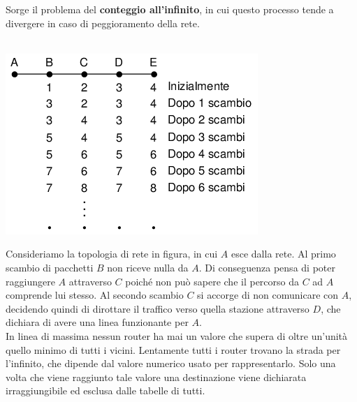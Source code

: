 \documentclass[10pt,a4paper,twoside]{article}
\begin{document}
Sorge il problema del \textbf{conteggio all'infinito}, in cui questo processo tende a divergere in caso di peggioramento della rete.\\\\
\begin{minipage}{0.3\textwidth}
\includegraphics[width=\textwidth]{images/count_to_infinity.png}
\end{minipage}
\begin{minipage}{0.7\textwidth}
Consideriamo la topologia di rete in figura, in cui $A$ esce dalla rete. Al primo scambio di pacchetti $B$ non riceve nulla da $A$. Di conseguenza pensa di poter raggiungere $A$ attraverso $C$ poiché non può sapere che il percorso da $C$ ad $A$ comprende lui stesso. Al secondo scambio $C$ si accorge di non comunicare con $A$, decidendo quindi di dirottare il traffico verso quella stazione attraverso $D$, che dichiara di avere una linea funzionante per $A$.\\
In linea di massima nessun router ha mai un valore che supera di oltre un'unità quello minimo di tutti i vicini. Lentamente tutti i router trovano la strada per l'infinito, che dipende dal valore numerico usato per rappresentarlo. Solo una volta che viene raggiunto tale valore una destinazione viene dichiarata irraggiungibile ed esclusa dalle tabelle di tutti.
\end{minipage}
\end{document}
